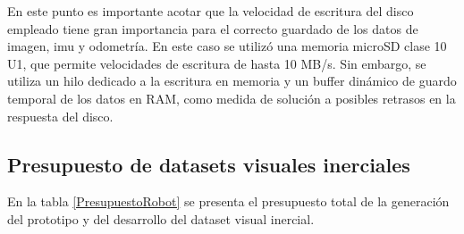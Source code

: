 En este punto es importante acotar que la velocidad de escritura del disco empleado tiene gran importancia para el correcto guardado de los datos de imagen, imu y odometría. En este caso se utilizó una memoria microSD clase 10  U1, que permite velocidades de escritura de hasta 10 MB/s. Sin embargo, se utiliza un hilo dedicado a la escritura en memoria y un buffer dinámico de guardo temporal de los datos en RAM, como medida de solución a posibles retrasos en la respuesta del disco.


\subsection{Presupuesto de datasets visuales inerciales}

En la tabla \ref{PresupuestoRobot} se presenta el presupuesto total de la generación del prototipo y del desarrollo del dataset visual inercial.


